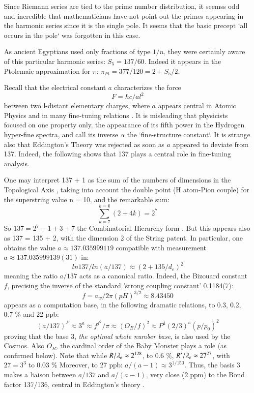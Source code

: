 \documentclass[twoside,draft]{article}
\begin{document}
\begin{sloppypar}
Since Riemann series are tied to the prime number distribution, it seemss odd and incredible that mathematicians
have not point out the primes appearing in the harmonic series since it is the single pole. It seems
that the basic precept `all occurs in the pole` was forgotten in this case. 

As ancient Egyptians used only fractions of type $1/n$, they were certainly aware of this particular harmonic series: 
$S_{5} = 137/60$. Indeed it appears in the Ptolemaic approximation for $\pi$: $\pi_{Pt} = 377/120 = 2 +  S_{5}/2$.

Recall that the electrical constant $a$ characterizes the force $$F =\hbar c/al^{2}$$ between two l-distant
elementary charges, where $a$ appears central in Atomic Physics and in many fine-tuning relations \cite{Carr}. It is
misleading that physicists focused on one property only, the appearance of its fifth power in the
Hydrogen hyper-fine spectra, and call its inverse $\alpha$ the `fine-structure constant`. It is strange also that
Eddington's Theory was rejected as soon as $a$ appeared to deviate from 137. Indeed, the
following shows that 137 plays a central role in fine-tuning analysis. 

One may interpret 137 + 1 as
the sum of the numbers of dimensions in the Topological Axis \cite{Sanchez1}, taking into account the double
point (H atom-Pion couple) for the superstring value n = 10, and the remarkable sum:
\begin{equation}
\sum_{k=7}^{k=0}(2 + 4 k ) = 2^{7}
\end{equation}
So $137 = 2^{7} - 1 + 3 + 7$ the Combinatorial Hierarchy form \cite{Sanchez1}. But this appears also as 137 = 135 + 2,
with the dimension 2 of the String patent. In particular, one obtains the value $a \approx 137.035999119$
compatible with measurement $a \approx 137.035999139(31)$ in:
\begin{equation}
ln137/ln(a/137) \approx (2+135/d_{e})^{2}
\end{equation}
meaning the ratio $a/137$ acts as a canonical ratio. Indeed, the Bizouard constant $f$, precising \cite{Sanchez1} the inverse of the standard 'strong coupling constant' 0.1184(7): $$f = a_w/2\pi(pH)^{3/2} \approx 8.43450$$ appears as a computation base, in the following dramatic relations, to 0.3, 0.2, 0.7 \% and 22 ppb:
$$(a/137)^F \approx 3^a \approx f^{f^2}/\pi \approx (O_B/f)^2 \approx P^4 (2/3)^a (p/p_0)^2 $$
proving that the base 3, \textit{the optimal whole number base}, is also used by the Cosmos. Also $O_B$, the cardinal order  of the Baby Monster plays a role (as confirmed below). 
Note that while $R/\lambdabar_e \approx 2^{128}$, to 0.6 \%, $R^{\prime}/\lambdabar_e \approx 27^{27}$, with $27 = 3^3$ to 0.03 \%  Moreover, to 27 ppb:
$ a/(a-1) \approx 3^{1/150} $. Thus, the basis 3 makes a liaison between $a/137$ and $a/(a-1)$, very close (2 ppm) to the Bond factor 137/136, central in Eddington's theory \cite{Eddington}.


\end{sloppypar}
\end{document}
